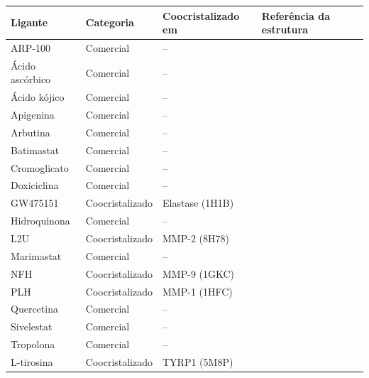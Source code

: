 \begin{table}[H]
\centering
\footnotesize
\setlength{\tabcolsep}{3pt}
\renewcommand{\arraystretch}{1.15}
\label{quad:ligantes_comerciais_literatura}
\vspace{3pt}
\begin{tabular}{|C{3.0cm}|C{3.3cm}|C{4.0cm}|C{4.0cm}|}
\hline
\textbf{Ligante} & \textbf{Categoria} & \textbf{Coocristalizado em} & \textbf{Referência da estrutura} \\
\hline
ARP-100 & Comercial & -- & \parencite{pubchem2023} \\
\hline
Ácido ascórbico & Comercial & -- & \parencite{pubchem2023} \\
\hline
Ácido kójico & Comercial & -- & \parencite{pubchem2023} \\
\hline
Apigenina & Comercial & -- & \parencite{pubchem2023} \\
\hline
Arbutina & Comercial & -- & \parencite{pubchem2023} \\
\hline
Batimastat & Comercial & -- & \parencite{pubchem2023} \\
\hline
Cromoglicato & Comercial & -- & \parencite{pubchem2023} \\
\hline
Doxiciclina & Comercial & -- & \parencite{pubchem2023} \\
\hline
GW475151 & Coocristalizado & Elastase (1H1B) & \parencite{macdonald2002} \\
\hline
Hidroquinona & Comercial & -- & \parencite{pubchem2023} \\
\hline
L2U & Coocristalizado & MMP-2 (8H78) & \parencite{takeuchi2023} \\
\hline
Marimastat & Comercial & -- & \parencite{pubchem2023} \\
\hline
NFH & Coocristalizado & MMP-9 (1GKC) & \parencite{rowsell2002} \\
\hline
PLH & Coocristalizado & MMP-1 (1HFC) & \parencite{spurlino1994} \\
\hline
Quercetina & Comercial & -- & \parencite{pubchem2023} \\
\hline
Sivelestat & Comercial & -- & \parencite{pubchem2023} \\
\hline
Tropolona & Comercial & -- & \parencite{pubchem2023} \\
\hline
L-tirosina & Coocristalizado & TYRP1 (5M8P) & \parencite{lai2017} \\
\hline
\end{tabular}
\end{table}

